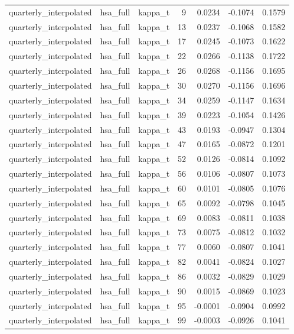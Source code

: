 \begin{tabular}{lllrrrr}
quarterly\_interpolated & hsa\_full & kappa\_t & 9 & 0.0234 & -0.1074 & 0.1579 \\
quarterly\_interpolated & hsa\_full & kappa\_t & 13 & 0.0237 & -0.1068 & 0.1582 \\
quarterly\_interpolated & hsa\_full & kappa\_t & 17 & 0.0245 & -0.1073 & 0.1622 \\
quarterly\_interpolated & hsa\_full & kappa\_t & 22 & 0.0266 & -0.1138 & 0.1722 \\
quarterly\_interpolated & hsa\_full & kappa\_t & 26 & 0.0268 & -0.1156 & 0.1695 \\
quarterly\_interpolated & hsa\_full & kappa\_t & 30 & 0.0270 & -0.1156 & 0.1696 \\
quarterly\_interpolated & hsa\_full & kappa\_t & 34 & 0.0259 & -0.1147 & 0.1634 \\
quarterly\_interpolated & hsa\_full & kappa\_t & 39 & 0.0223 & -0.1054 & 0.1426 \\
quarterly\_interpolated & hsa\_full & kappa\_t & 43 & 0.0193 & -0.0947 & 0.1304 \\
quarterly\_interpolated & hsa\_full & kappa\_t & 47 & 0.0165 & -0.0872 & 0.1201 \\
quarterly\_interpolated & hsa\_full & kappa\_t & 52 & 0.0126 & -0.0814 & 0.1092 \\
quarterly\_interpolated & hsa\_full & kappa\_t & 56 & 0.0106 & -0.0807 & 0.1073 \\
quarterly\_interpolated & hsa\_full & kappa\_t & 60 & 0.0101 & -0.0805 & 0.1076 \\
quarterly\_interpolated & hsa\_full & kappa\_t & 65 & 0.0092 & -0.0798 & 0.1045 \\
quarterly\_interpolated & hsa\_full & kappa\_t & 69 & 0.0083 & -0.0811 & 0.1038 \\
quarterly\_interpolated & hsa\_full & kappa\_t & 73 & 0.0075 & -0.0812 & 0.1032 \\
quarterly\_interpolated & hsa\_full & kappa\_t & 77 & 0.0060 & -0.0807 & 0.1041 \\
quarterly\_interpolated & hsa\_full & kappa\_t & 82 & 0.0041 & -0.0824 & 0.1027 \\
quarterly\_interpolated & hsa\_full & kappa\_t & 86 & 0.0032 & -0.0829 & 0.1029 \\
quarterly\_interpolated & hsa\_full & kappa\_t & 90 & 0.0015 & -0.0869 & 0.1023 \\
quarterly\_interpolated & hsa\_full & kappa\_t & 95 & -0.0001 & -0.0904 & 0.0992 \\
quarterly\_interpolated & hsa\_full & kappa\_t & 99 & -0.0003 & -0.0926 & 0.1041 \\

\end{tabular}
